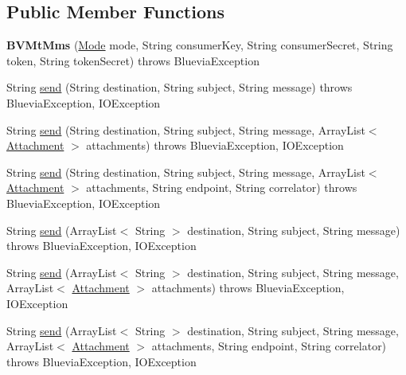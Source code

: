 \subsection*{Public Member Functions}
\begin{DoxyCompactItemize}
\item 
\hypertarget{classcom_1_1bluevia_1_1messagery_1_1mt_1_1mms_1_1client_1_1BVMtMms_a66f5474cb91ac2b5e623e65e367447c0}{
{\bfseries BVMtMms} (\hyperlink{classcom_1_1bluevia_1_1commons_1_1client_1_1BVBaseClient_a5f4a4a27d73a8ddd0ce450a6c7a4d1b7}{Mode} mode, String consumerKey, String consumerSecret, String token, String tokenSecret)  throws BlueviaException}
\label{classcom_1_1bluevia_1_1messagery_1_1mt_1_1mms_1_1client_1_1BVMtMms_a66f5474cb91ac2b5e623e65e367447c0}

\item 
String \hyperlink{classcom_1_1bluevia_1_1messagery_1_1mt_1_1mms_1_1client_1_1BVMtMms_a072eb03fdfa34d6c5ad7171aee69ae6c}{send} (String destination, String subject, String message)  throws BlueviaException, IOException 
\item 
String \hyperlink{classcom_1_1bluevia_1_1messagery_1_1mt_1_1mms_1_1client_1_1BVMtMms_a9380e3d3762fe2d57da622eccdc7e9d4}{send} (String destination, String subject, String message, ArrayList$<$ \hyperlink{classcom_1_1bluevia_1_1messagery_1_1mt_1_1mms_1_1data_1_1Attachment}{Attachment} $>$ attachments)  throws BlueviaException, IOException 
\item 
String \hyperlink{classcom_1_1bluevia_1_1messagery_1_1mt_1_1mms_1_1client_1_1BVMtMms_ad6ae4957479dd13080e94da8736a9a83}{send} (String destination, String subject, String message, ArrayList$<$ \hyperlink{classcom_1_1bluevia_1_1messagery_1_1mt_1_1mms_1_1data_1_1Attachment}{Attachment} $>$ attachments, String endpoint, String correlator)  throws BlueviaException, IOException 
\item 
String \hyperlink{classcom_1_1bluevia_1_1messagery_1_1mt_1_1mms_1_1client_1_1BVMtMms_a6562063a5b5cf6d525c8cbdc23994e02}{send} (ArrayList$<$ String $>$ destination, String subject, String message)  throws BlueviaException, IOException 
\item 
String \hyperlink{classcom_1_1bluevia_1_1messagery_1_1mt_1_1mms_1_1client_1_1BVMtMms_a34552d7d00b0c1f723bbfb9cc345356c}{send} (ArrayList$<$ String $>$ destination, String subject, String message, ArrayList$<$ \hyperlink{classcom_1_1bluevia_1_1messagery_1_1mt_1_1mms_1_1data_1_1Attachment}{Attachment} $>$ attachments)  throws BlueviaException, IOException 
\item 
String \hyperlink{classcom_1_1bluevia_1_1messagery_1_1mt_1_1mms_1_1client_1_1BVMtMms_ac891b793290862a936a51f7f9145bcad}{send} (ArrayList$<$ String $>$ destination, String subject, String message, ArrayList$<$ \hyperlink{classcom_1_1bluevia_1_1messagery_1_1mt_1_1mms_1_1data_1_1Attachment}{Attachment} $>$ attachments, String endpoint, String correlator)  throws BlueviaException, IOException 
\end{DoxyCompactItemize}
